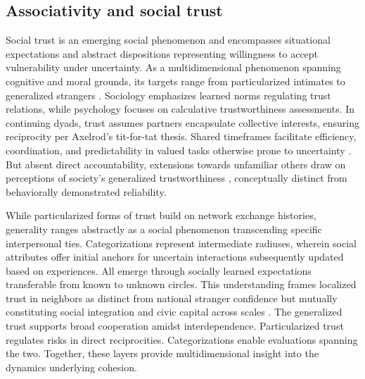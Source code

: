 \subsection{Associativity and social trust}

Social trust is an emerging social phenomenon \parencite{kuwabara_cohesion_2011,tilly_trust_2005} and encompasses situational expectations and abstract dispositions representing willingness to accept vulnerability under uncertainty. As a multidimensional phenomenon spanning cognitive and moral grounds, its targets range from particularized intimates to generalized strangers \parencite{schilke_trust_2021}. Sociology emphasizes learned norms regulating trust relations, while psychology focuses on calculative trustworthiness assessments. In continuing dyads, trust assumes partners encapsulate collective interests, ensuring reciprocity per Axelrod’s \parencite*{axelrod_evolution_1984} tit-for-tat thesis. Shared timeframes facilitate efficiency, coordination, and predictability in valued tasks otherwise prone to uncertainty \parencite{hardin_conceptions_2001, tilly_trust_2005}. But absent direct accountability, extensions towards unfamiliar others draw on perceptions of society’s generalized trustworthiness \parencite{paxton_trust_2018, paxton_association_2007}, conceptually distinct from behaviorally demonstrated reliability.
\bigskip

While particularized forms of trust build on network exchange histories, generality ranges abstractly as a social phenomenon transcending specific interpersonal ties. Categorizations represent intermediate radiuses, wherein social attributes offer initial anchors for uncertain interactions subsequently updated based on experiences. All emerge through socially learned expectations transferable from known to unknown circles. This understanding frames localized trust in neighbors as distinct from national stranger confidence but mutually constituting social integration and civic capital across scales \parencite{paxton_association_2007}. The generalized trust supports broad cooperation amidst interdependence. Particularized trust regulates risks in direct reciprocities. Categorizations enable evaluations spanning the two. Together, these layers provide multidimensional insight into the dynamics underlying cohesion.

\bigskip


